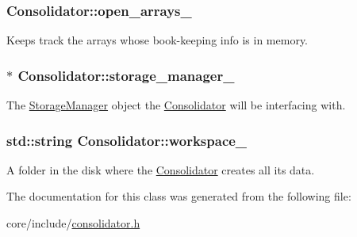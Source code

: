 \subsubsection[{open\+\_\+arrays\+\_\+}]{ Consolidator\+::open\+\_\+arrays\+\_\+\hspace{0.3cm}{\ttfamily [private]}}\label{classConsolidator_a3a86f55ce360cefaa78c89fead0e96d8}
Keeps track the arrays whose book-\/keeping info is in memory. \hypertarget{classConsolidator_a7ab47b31c28e86b2f5b1293e19358c73}{}
\subsubsection[{storage\+\_\+manager\+\_\+}]{$\ast$ Consolidator\+::storage\+\_\+manager\+\_\+\hspace{0.3cm}{\ttfamily [private]}}\label{classConsolidator_a7ab47b31c28e86b2f5b1293e19358c73}
The \hyperlink{classStorageManager}{Storage\+Manager} object the \hyperlink{classConsolidator}{Consolidator} will be interfacing with. \hypertarget{classConsolidator_a68b0628a61ce528daa6d1c2bf07e033d}{}
\subsubsection[{workspace\+\_\+}]{\setlength{\rightskip}{0pt plus 5cm}std\+::string Consolidator\+::workspace\+\_\+\hspace{0.3cm}{\ttfamily [private]}}\label{classConsolidator_a68b0628a61ce528daa6d1c2bf07e033d}
A folder in the disk where the \hyperlink{classConsolidator}{Consolidator} creates all its data. 

The documentation for this class was generated from the following file\+:\begin{DoxyCompactItemize}
\item 
core/include/\hyperlink{consolidator_8h}{consolidator.\+h}\end{DoxyCompactItemize}
